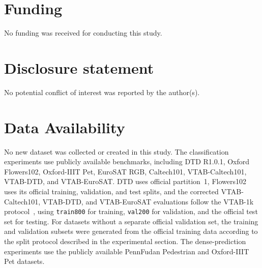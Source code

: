 \documentclass[pdflatex,sn-mathphys-num]{sn-jnl}
\theoremstyle{thmstyleone}
\theoremstyle{thmstyletwo}
\theoremstyle{thmstylethree}
\begin{document}
\section*{Funding}

No funding was received for conducting this study.
\section*{Disclosure statement}

No potential conflict of interest was reported by the author(s).


\section*{Data Availability}

No new dataset was collected or created in this study. The classification
experiments use publicly available benchmarks, including DTD R1.0.1,
Oxford Flowers102, Oxford-IIIT Pet, EuroSAT RGB, Caltech101,
VTAB-Caltech101, VTAB-DTD, and VTAB-EuroSAT. DTD uses official partition~1, Flowers102
uses its official training, validation, and test splits, and the corrected
VTAB-Caltech101, VTAB-DTD, and VTAB-EuroSAT evaluations follow the VTAB-1k protocol~\cite{zhai2019vtab},
using \texttt{train800} for training, \texttt{val200} for validation, and the
official test set for testing. For datasets without a separate
official validation set, the training and validation subsets were generated
from the official training data according to the split protocol described in
the experimental section. The dense-prediction experiments use the publicly
available PennFudan Pedestrian and Oxford-IIIT Pet datasets.
\end{document}
